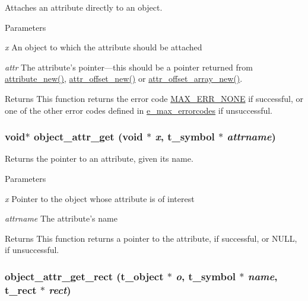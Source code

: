 Attaches an attribute directly to an object. 
\begin{DoxyParams}{Parameters}
\item[{\em x}]An object to which the attribute should be attached \item[{\em attr}]The attribute's pointer—this should be a pointer returned from \hyperlink{group__attr_ga24badeb31a79d844935b2a1c8423c905}{attribute\_\-new()}, \hyperlink{group__attr_ga089ad1af7af1d0771b4a4e1417d16779}{attr\_\-offset\_\-new()} or \hyperlink{group__attr_ga3828e337f808838f30599ae6bf01fdb9}{attr\_\-offset\_\-array\_\-new()}.\end{DoxyParams}
\begin{DoxyReturn}{Returns}
This function returns the error code \hyperlink{group__misc_gga0764dd6c02b76cca7d053ae50555d69da6d22f77fef8b1e1b074cef5d29d935fd}{MAX\_\-ERR\_\-NONE} if successful, or one of the other error codes defined in \hyperlink{group__misc_ga0764dd6c02b76cca7d053ae50555d69d}{e\_\-max\_\-errorcodes} if unsuccessful. 
\end{DoxyReturn}
\hypertarget{group__attr_ga26e3d2d547a494e2dbb994cff446a1d2}{
\subsubsection[{object\_\-attr\_\-get}]{\setlength{\rightskip}{0pt plus 5cm}void$\ast$ object\_\-attr\_\-get (void $\ast$ {\em x}, \/  {\bf t\_\-symbol} $\ast$ {\em attrname})}}
\label{group__attr_ga26e3d2d547a494e2dbb994cff446a1d2}


Returns the pointer to an attribute, given its name. 
\begin{DoxyParams}{Parameters}
\item[{\em x}]Pointer to the object whose attribute is of interest \item[{\em attrname}]The attribute's name\end{DoxyParams}
\begin{DoxyReturn}{Returns}
This function returns a pointer to the attribute, if successful, or NULL, if unsuccessful. 
\end{DoxyReturn}
\hypertarget{group__attr_ga9182014f40b2a2068268b3f3f10547ee}{
\subsubsection[{object\_\-attr\_\-get\_\-rect}]{ object\_\-attr\_\-get\_\-rect ({\bf t\_\-object} $\ast$ {\em o}, \/  {\bf t\_\-symbol} $\ast$ {\em name}, \/  {\bf t\_\-rect} $\ast$ {\em rect})}}
\label{group__attr_ga9182014f40b2a2068268b3f3f10547ee}


